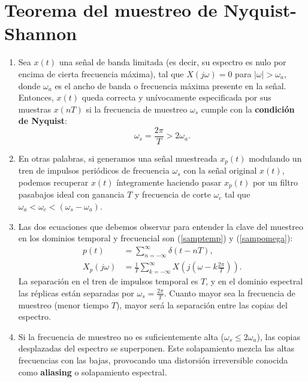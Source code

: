 \section{Teorema del muestreo de Nyquist-Shannon}

\begin{enumerate}
	\item Sea $x(t)$ una se\~{n}al de banda limitada (es decir, su espectro es nulo por encima de cierta frecuencia máxima), tal que $X(j\omega) = 0$ para $|\omega| > \omega_{a}$, donde $\omega_{a}$ es el ancho de banda o frecuencia máxima presente en la se\~{n}al. Entonces, $x(t)$ queda correcta y unívocamente especificada por sus muestras $x(nT)$ si la frecuencia de muestreo $\omega_s$ cumple con la \textbf{condición de Nyquist}:
	\begin{equation}
		\omega_{s} = \frac{2\pi}{T} > 2\omega_{a}.
	\end{equation}
	
	\item En otras palabras, si generamos una se\~{n}al muestreada $x_{p}(t)$ modulando un tren de impulsos peri\'{o}dicos de frecuencia $\omega_{s}$ con la se\~{n}al original $x(t)$, podemos recuperar $x(t)$ íntegramente haciendo pasar $x_{p}(t)$ por un filtro pasabajos ideal con ganancia $T$ y frecuencia de corte $\omega_c$ tal que $\omega_{a} < \omega_{c} < (\omega_{s}-\omega_{a})$.
	
	\item Las dos ecuaciones que debemos observar para entender la clave del muestreo en los dominios temporal y frecuencial son (\ref{samptemp}) y (\ref{sampomega}):
	\begin{align}
		p(t) &= \sum_{n=-\infty}^{\infty} \delta(t-nT), \\
		X_{p}(j\omega) &= \frac{1}{T} \sum_{k=-\infty}^{\infty} X\left(j\left(\omega - k\frac{2\pi}{T}\right)\right).
	\end{align}
	La separaci\'{o}n en el tren de impulsos temporal es $T$, y en el dominio espectral las réplicas están separadas por $\omega_s = \frac{2\pi}{T}$. Cuanto mayor sea la frecuencia de muestreo (menor tiempo $T$), mayor será la separaci\'{o}n entre las copias del espectro.
	
	\item Si la frecuencia de muestreo no es suficientemente alta ($\omega_s \leq 2\omega_a$), las copias desplazadas del espectro se superponen. Este solapamiento mezcla las altas frecuencias con las bajas, provocando una distorsión irreversible conocida como \textbf{aliasing} o solapamiento espectral.
\end{enumerate}

